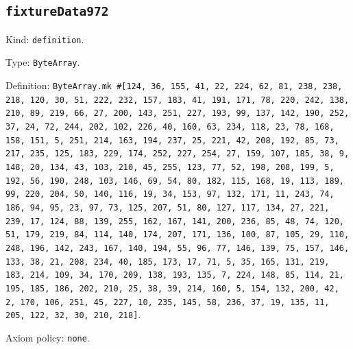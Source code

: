 \documentclass[11pt]{article}
\begin{document}
\subsection*{\texttt{fixtureData972}}
\noindent Kind: \texttt{definition}.\par
\noindent Type: \texttt{ByteArray}.\par
\noindent Definition: \texttt{ByteArray.mk \#[124, 36, 155, 41, 22, 224, 62, 81, 238, 238, 218, 120, 30, 51, 222, 232, 157, 183, 41, 191, 171, 78, 220, 242, 138, 210, 89, 219, 66, 27, 200, 143, 251, 227, 193, 99, 137, 142, 190, 252, 37, 24, 72, 244, 202, 102, 226, 40, 160, 63, 234, 118, 23, 78, 168, 158, 151, 5, 251, 214, 163, 194, 237, 25, 221, 42, 208, 192, 85, 73, 217, 235, 125, 183, 229, 174, 252, 227, 254, 27, 159, 107, 185, 38, 9, 148, 20, 134, 43, 103, 210, 45, 255, 123, 77, 52, 198, 208, 199, 5, 192, 56, 190, 248, 103, 146, 69, 54, 80, 182, 115, 168, 19, 113, 189, 99, 220, 204, 50, 140, 116, 19, 34, 153, 97, 132, 171, 11, 243, 74, 186, 94, 95, 23, 97, 73, 125, 207, 51, 80, 127, 117, 134, 27, 221, 239, 17, 124, 88, 139, 255, 162, 167, 141, 200, 236, 85, 48, 74, 120, 51, 179, 219, 84, 114, 140, 174, 207, 171, 136, 100, 87, 105, 29, 110, 248, 196, 142, 243, 167, 140, 194, 55, 96, 77, 146, 139, 75, 157, 146, 133, 38, 21, 208, 234, 40, 185, 173, 17, 71, 5, 35, 165, 131, 219, 183, 214, 109, 34, 170, 209, 138, 193, 135, 7, 224, 148, 85, 114, 21, 195, 185, 186, 202, 210, 25, 38, 39, 214, 160, 5, 154, 132, 200, 42, 2, 170, 106, 251, 45, 227, 10, 235, 145, 58, 236, 37, 19, 135, 11, 205, 122, 32, 30, 210, 218]}.\par
\noindent Axiom policy: \texttt{none}.\par
\end{document}
